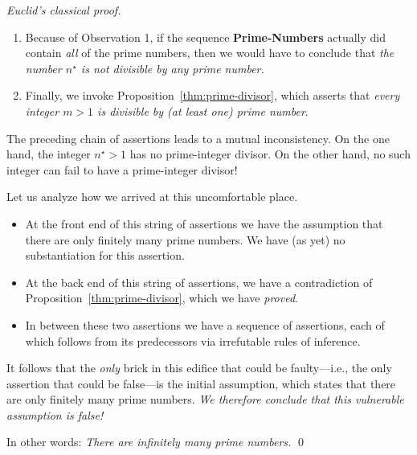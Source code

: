 \begin{proof} [Euclid's classical proof]
\begin{enumerate}
\medskip\item
Because of Observation 1, if the sequence {\bf Prime-Numbers} actually did contain {\em all} of the prime numbers, then we would have to conclude that {\em the number $n^\star$ is not divisible by any prime number.}

\medskip\item
Finally, we invoke Proposition~\ref{thm:prime-divisor}, which asserts that {\em every integer $m >1$ is divisible by (at least one) prime number}.
\end{enumerate}
The preceding chain of assertions leads to a mutual inconsistency.  On the one hand, the integer $n^\star >1$ has no prime-integer divisor. On the other hand, no such integer can fail to have a prime-integer divisor!

\medskip

Let us analyze how we arrived at this uncomfortable place.
\begin{itemize}
\item
At the front end of this string of assertions we have the assumption that there are only finitely many prime numbers.  We have (as yet) no substantiation for this assertion.
\medskip\item
At the back end of this string of assertions, we have a contradiction of Proposition~\ref{thm:prime-divisor}, which we have {\em proved}.

\medskip\item
In between these two assertions we have a sequence of assertions, each of which follows from its predecessors via irrefutable rules of inference.
\end{itemize}
It follows that the {\em only} brick in this edifice that could be faulty---i.e., the only assertion that could be false---is the initial assumption, which states that there are only finitely many prime
numbers.  {\em We therefore conclude that this vulnerable assumption is false!} 

\smallskip

In other words: {\em There are infinitely many prime numbers.}  \qed
\end{proof}


\smallskip

